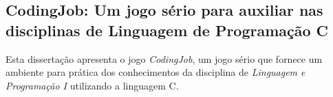 \subsection{CodingJob: Um jogo sério para auxiliar nas disciplinas de Linguagem de Programação C}

Esta dissertação apresenta o jogo \textit{CodingJob}, um jogo sério que fornece um ambiente para prática dos conhecimentos da disciplina de \textit{Linguagem e Programação I} utilizando a linguagem C. \cite{costa2023condigjob}



